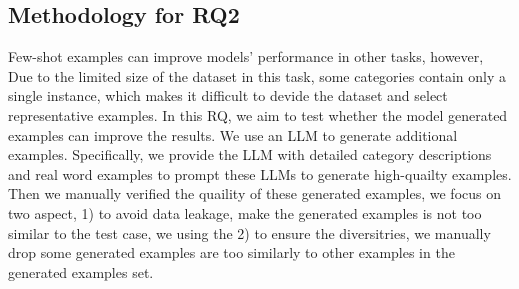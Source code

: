 \documentclass[acmsmall,screen,review,anonymous]{acmart}
\begin{document}

















\subsection{Methodology for RQ2}\label{sec:RQ2}



Few-shot examples can improve models' performance in other tasks, however, Due to the limited size of the dataset in this task, some categories contain only a single instance, which makes it difficult to devide the dataset and select representative examples. In this RQ, we aim to test whether the model generated examples can improve the results. We use an LLM to generate additional examples. Specifically, we provide the LLM with detailed category descriptions and real word examples to prompt these LLMs to generate high-quailty examples. Then we manually verified the quaility of these generated examples, we focus on two aspect, 1) to avoid data leakage, make the generated examples is not too similar to the test case, we using the 2) to ensure the diversitries, we manually drop some generated examples are too similarly to other examples in the generated examples set. 
\end{document}
